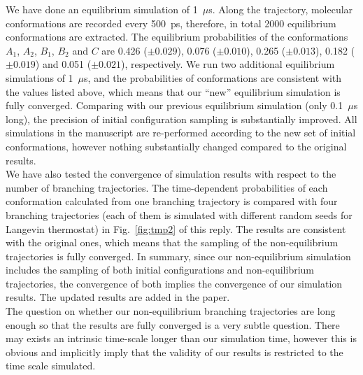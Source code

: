 \documentclass[]{revtex4-1}
\begin{document}
We have done an equilibrium simulation of 1~$\mu$s.  Along the
trajectory, molecular conformations are recorded every 500~ps,
therefore, in total 2000 equilibrium conformations are extracted.  The
equilibrium probabilities of the conformations $A_1$, $A_2$, $B_1$,
$B_2$ and $C$ are 0.426 ($\pm 0.029$), 0.076 ($\pm 0.010$), 0.265
($\pm 0.013$), 0.182 ($\pm 0.019$) and 0.051 ($\pm 0.021$),
respectively.  We run two additional equilibrium simulations of
1~$\mu$s, and the probabilities of conformations are consistent with
the values listed above, which means that our ``new'' equilibrium
simulation is fully converged.  Comparing with our previous
equilibrium simulation (only 0.1~$\mu$s long),
the precision
of initial configuration sampling is substantially improved. All
simulations in the manuscript are re-performed according to the new set
of initial conformations, however nothing substantially changed compared to the original results.\\

We have also tested the convergence of simulation results with respect to the
number of branching trajectories.  The time-dependent probabilities of
each conformation calculated from one branching trajectory is compared
with four branching trajectories (each of them is simulated with
different random seeds for Langevin thermostat) in
Fig.~\ref{fig:tmp2} of this reply. The results are consistent with the original ones, which means that the
sampling of the non-equilibrium trajectories is fully converged. In
summary, since our non-equilibrium simulation includes the
sampling of both initial configurations and non-equilibrium
trajectories, the convergence of both  implies the convergence
of our simulation results. 
The updated results are added in the paper.\\

The question on whether our non-equilibrium branching trajectories are
long enough so that the results are fully converged is a very subtle
question. There may exists an intrinsic time-scale longer than our simulation time, however this is obvious and implicitly imply that the validity of our results is restricted to the time scale simulated. 
\\
\end{document}

